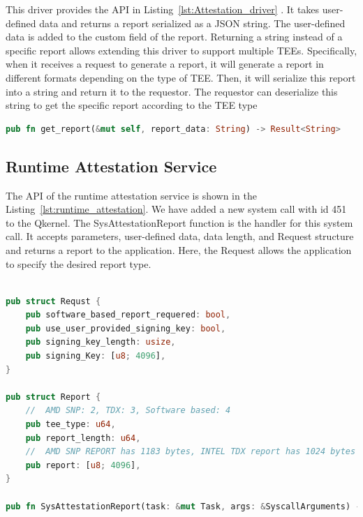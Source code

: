 This driver provides the API in Listing~\ref{lst:Attestation_driver} . It takes user-defined data and returns a report serialized as a JSON string. The user-defined data is added to the custom field of the report. Returning a string instead of a specific report allows extending this driver to support multiple \acrshort{TEE}s. Specifically,  
when it receives a request to generate a report, it will generate a report in different formats depending on the type of \acrshort{TEE}. Then, it will serialize this report into a string and return it to the requestor. The requestor can deserialize this string to get the specific report according to the \acrshort{TEE} type
\begin{lstlisting}[language=rust, caption= API of attestation driver, label={lst:Attestation_driver}]
pub fn get_report(&mut self, report_data: String) -> Result<String>   
\end{lstlisting}

\subsection{Runtime Attestation Service}
The API of the runtime attestation service is shown in the Listing~\ref{lst:runtime_attestation}. We have added a new system call with id 451 to the Qkernel. The SysAttestationReport function is the handler for this system call. It accepts parameters, user-defined data, data length, and Request structure and returns a report to 
the application. Here, the Request allows the application to specify the desired report type.

\begin{lstlisting}[language=rust, caption= Interface for accessing the file type secrets, label={lst:runtime_attestation}]

pub struct Requst {
    pub software_based_report_requered: bool,
    pub use_user_provided_signing_key: bool,
    pub signing_key_length: usize, 
    pub signing_Key: [u8; 4096],  
}

pub struct Report {
    //  AMD SNP: 2, TDX: 3, Software based: 4
    pub tee_type: u64,
    pub report_length: u64,
    //  AMD SNP REPORT has 1183 bytes, INTEL TDX report has 1024 bytes
    pub report: [u8; 4096],  
}

pub fn SysAttestationReport(task: &mut Task, args: &SyscallArguments) -> Result<i64>      
\end{lstlisting}

